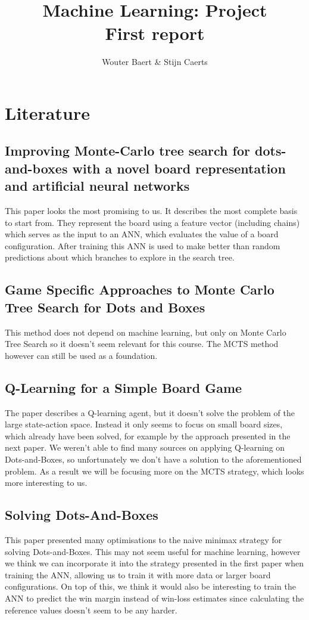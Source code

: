 \documentclass[11pt,a4paper]{article}
\author{Wouter Baert \& Stijn Caerts}
\title{Machine Learning: Project \\ \small{First report}}
\begin{document}
	\maketitle
	\section{Literature}
	\subsection{Improving Monte-Carlo tree search for dots-and-boxes with a novel board representation and artificial neural networks \cite{7317912}}
	This paper looks the most promising to us. It describes the most complete basis to start from. They represent the board using a feature vector (including chains) which serves as the input to an ANN, which evaluates the value of a board configuration. After training this ANN is used to make better than random predictions about which branches to explore in the search tree.
	
	\subsection{Game Specific Approaches to Monte Carlo Tree Search for Dots and Boxes \cite{GSA}}
	This method does not depend on machine learning, but only on Monte Carlo Tree Search so it doesn't seem relevant for this course. The MCTS method however can still be used as a foundation.
	
	\subsection{Q-Learning for a Simple Board Game \cite{QL}}
	The paper describes a Q-learning agent, but it doesn't solve the problem of the large state-action space. Instead it only seems to focus on small board sizes, which already have been solved, for example by the approach presented in the next paper. We weren't able to find many sources on applying Q-learning on Dots-and-Boxes, so unfortunately we don't have a solution to the aforementioned problem. As a result we will be focusing more on the MCTS strategy, which looks more interesting to us.
	
	\subsection{Solving Dots-And-Boxes \cite{Barker:2012:SD:2900728.2900788}}
	This paper presented many optimisations to the naive minimax strategy for solving Dots-and-Boxes. This may not seem useful for machine learning, however we think we can incorporate it into the strategy presented in the first paper when training the ANN, allowing us to train it with more data or larger board configurations. On top of this, we think it would also be interesting to train the ANN to predict the win margin instead of win-loss estimates since calculating the reference values doesn't seem to be any harder.
	
\end{document}
